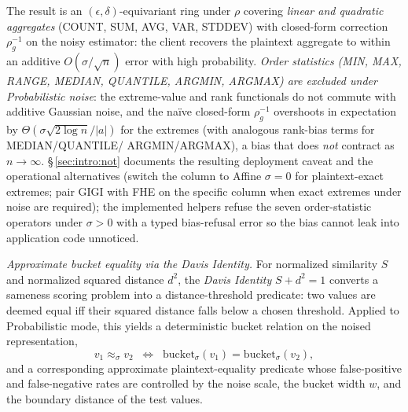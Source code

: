 \documentclass[11pt,letterpaper]{article}
\begin{document}
The result is an $(\epsilon,\delta)$-equivariant ring under $\rho$
covering \emph{linear and quadratic aggregates}
(COUNT, SUM, AVG, VAR, STDDEV) with closed-form correction
$\rho_g^{-1}$ on the noisy estimator: the
client recovers the plaintext aggregate to within an additive
$O(\sigma/\sqrt{n})$ error with high probability.
\emph{Order statistics (MIN, MAX, RANGE, MEDIAN, QUANTILE,
ARGMIN, ARGMAX) are excluded under Probabilistic noise}: the
extreme-value and rank functionals do not commute with additive
Gaussian noise, and the naïve closed-form $\rho_g^{-1}$ overshoots
in expectation by $\Theta(\sigma\sqrt{2\log n}/|a|)$ for the
extremes (with analogous rank-bias terms for MEDIAN/QUANTILE/
ARGMIN/ARGMAX), a bias that does \emph{not} contract as
$n \to \infty$. \S\,\ref{sec:intro:not} documents the resulting
deployment caveat and the operational alternatives (switch the
column to Affine $\sigma = 0$ for plaintext-exact extremes; pair
GIGI with FHE on the specific column when exact extremes under
noise are required); the implemented helpers refuse the seven
order-statistic operators under $\sigma > 0$ with a typed
bias-refusal error so the bias cannot leak into application code
unnoticed.
\smallskip

\noindent
\emph{Approximate bucket equality via the Davis Identity.}
For normalized similarity $S$ and normalized squared distance
$d^2$, the \emph{Davis Identity} $S + d^2 = 1$ converts a
sameness scoring problem into a distance-threshold predicate:
two values are deemed equal iff their squared distance falls
below a chosen threshold. Applied to Probabilistic mode, this
yields a deterministic bucket relation on the noised
representation,
\[
v_1 \approx_\sigma v_2 \;\;\Longleftrightarrow\;\;
\mathrm{bucket}_\sigma(v_1) = \mathrm{bucket}_\sigma(v_2),
\]
and a corresponding approximate plaintext-equality predicate
whose false-positive and false-negative rates are controlled by
the noise scale, the bucket width $w$, and the boundary distance
of the test values.
\end{document}
